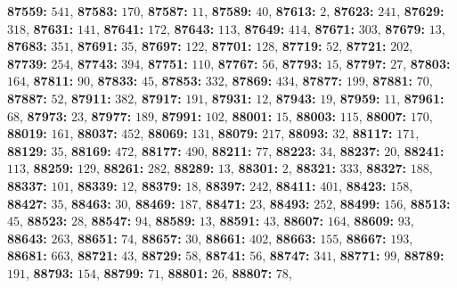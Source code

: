 \textsf{\bfseries 87559:} $541$, \textsf{\bfseries 87583:} $170$, \textsf{\bfseries 87587:} $11$, \textsf{\bfseries 87589:} $40$, \textsf{\bfseries 87613:} $2$, \textsf{\bfseries 87623:} $241$, \textsf{\bfseries 87629:} $318$, \textsf{\bfseries 87631:} $141$, \textsf{\bfseries 87641:} $172$, \textsf{\bfseries 87643:} $113$, \textsf{\bfseries 87649:} $414$, \textsf{\bfseries 87671:} $303$, \textsf{\bfseries 87679:} $13$, \textsf{\bfseries 87683:} $351$, \textsf{\bfseries 87691:} $35$, \textsf{\bfseries 87697:} $122$, \textsf{\bfseries 87701:} $128$, \textsf{\bfseries 87719:} $52$, \textsf{\bfseries 87721:} $202$, \textsf{\bfseries 87739:} $254$, \textsf{\bfseries 87743:} $394$, \textsf{\bfseries 87751:} $110$, \textsf{\bfseries 87767:} $56$, \textsf{\bfseries 87793:} $15$, \textsf{\bfseries 87797:} $27$, \textsf{\bfseries 87803:} $164$, \textsf{\bfseries 87811:} $90$, \textsf{\bfseries 87833:} $45$, \textsf{\bfseries 87853:} $332$, \textsf{\bfseries 87869:} $434$, \textsf{\bfseries 87877:} $199$, \textsf{\bfseries 87881:} $70$, \textsf{\bfseries 87887:} $52$, \textsf{\bfseries 87911:} $382$, \textsf{\bfseries 87917:} $191$, \textsf{\bfseries 87931:} $12$, \textsf{\bfseries 87943:} $19$, \textsf{\bfseries 87959:} $11$, \textsf{\bfseries 87961:} $68$, \textsf{\bfseries 87973:} $23$, \textsf{\bfseries 87977:} $189$, \textsf{\bfseries 87991:} $102$, \textsf{\bfseries 88001:} $15$, \textsf{\bfseries 88003:} $115$, \textsf{\bfseries 88007:} $170$, \textsf{\bfseries 88019:} $161$, \textsf{\bfseries 88037:} $452$, \textsf{\bfseries 88069:} $131$, \textsf{\bfseries 88079:} $217$, \textsf{\bfseries 88093:} $32$, \textsf{\bfseries 88117:} $171$, \textsf{\bfseries 88129:} $35$, \textsf{\bfseries 88169:} $472$, \textsf{\bfseries 88177:} $490$, \textsf{\bfseries 88211:} $77$, \textsf{\bfseries 88223:} $34$, \textsf{\bfseries 88237:} $20$, \textsf{\bfseries 88241:} $113$, \textsf{\bfseries 88259:} $129$, \textsf{\bfseries 88261:} $282$, \textsf{\bfseries 88289:} $13$, \textsf{\bfseries 88301:} $2$, \textsf{\bfseries 88321:} $333$, \textsf{\bfseries 88327:} $188$, \textsf{\bfseries 88337:} $101$, \textsf{\bfseries 88339:} $12$, \textsf{\bfseries 88379:} $18$, \textsf{\bfseries 88397:} $242$, \textsf{\bfseries 88411:} $401$, \textsf{\bfseries 88423:} $158$, \textsf{\bfseries 88427:} $35$, \textsf{\bfseries 88463:} $30$, \textsf{\bfseries 88469:} $187$, \textsf{\bfseries 88471:} $23$, \textsf{\bfseries 88493:} $252$, \textsf{\bfseries 88499:} $156$, \textsf{\bfseries 88513:} $45$, \textsf{\bfseries 88523:} $28$, \textsf{\bfseries 88547:} $94$, \textsf{\bfseries 88589:} $13$, \textsf{\bfseries 88591:} $43$, \textsf{\bfseries 88607:} $164$, \textsf{\bfseries 88609:} $93$, \textsf{\bfseries 88643:} $263$, \textsf{\bfseries 88651:} $74$, \textsf{\bfseries 88657:} $30$, \textsf{\bfseries 88661:} $402$, \textsf{\bfseries 88663:} $155$, \textsf{\bfseries 88667:} $193$, \textsf{\bfseries 88681:} $663$, \textsf{\bfseries 88721:} $43$, \textsf{\bfseries 88729:} $58$, \textsf{\bfseries 88741:} $56$, \textsf{\bfseries 88747:} $341$, \textsf{\bfseries 88771:} $99$, \textsf{\bfseries 88789:} $191$, \textsf{\bfseries 88793:} $154$, \textsf{\bfseries 88799:} $71$, \textsf{\bfseries 88801:} $26$, \textsf{\bfseries 88807:} $78$, 
